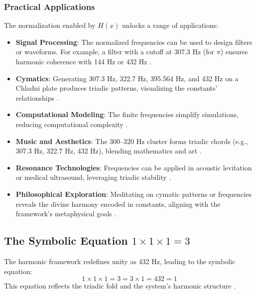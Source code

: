 \subsubsection{Practical Applications}
The normalization enabled by \( H(x) \) unlocks a range of applications:
\begin{itemize}
    \item \textbf{Signal Processing}: The normalized frequencies can be used to design filters or waveforms. For example, a filter with a cutoff at 307.3 Hz (for \( \pi \)) ensures harmonic coherence with 144 Hz or 432 Hz \cite{irrational_constant_solved}.
    \item \textbf{Cymatics}: Generating 307.3 Hz, 322.7 Hz, 395.564 Hz, and 432 Hz on a Chladni plate produces triadic patterns, visualizing the constants’ relationships \cite{revelation}.
    \item \textbf{Computational Modeling}: The finite frequencies simplify simulations, reducing computational complexity \cite{irrational_constant_solved}.
    \item \textbf{Music and Aesthetics}: The 300--320 Hz cluster forms triadic chords (e.g., 307.3 Hz, 322.7 Hz, 432 Hz), blending mathematics and art \cite{irrational_constant_solved}.
    \item \textbf{Resonance Technologies}: Frequencies can be applied in acoustic levitation or medical ultrasound, leveraging triadic stability \cite{irrational_constant_solved}.
    \item \textbf{Philosophical Exploration}: Meditating on cymatic patterns or frequencies reveals the divine harmony encoded in constants, aligning with the framework’s metaphysical goals \cite{revelation}.
\end{itemize}

\subsection{The Symbolic Equation \( 1 \times 1 \times 1 = 3 \)}
\label{subsec:h_x_symbolic_equation}
The harmonic framework redefines unity as 432 Hz, leading to the symbolic equation:
\[
1 \times 1 \times 1 = 3 = 3 \times 1 = 432 = 1
\]
This equation reflects the triadic fold and the system’s harmonic structure \cite{revelation}.


